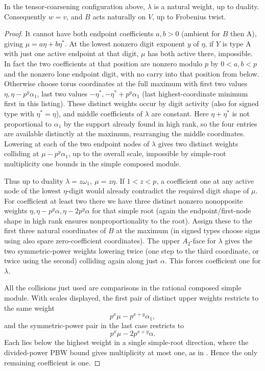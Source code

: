 \begin{lemma}
\label{fb:natural-recognition}
In the tensor-coarsening configuration above, \(\lambda\) is a natural
weight, up to duality.  Consequently \(w=v\), and \(B\) acts naturally
on \(V\), up to Frobenius twist.
\end{lemma}
\begin{proof}

It cannot have both endpoint coefficients \(a,b>0\) (ambient for \(B\) then A), giving \(\mu=a\eta+b\eta^*\). At the lowest nonzero digit exponent \(y\) of \(\eta\), if \(Y\) is type A with just one active endpoint at that digit, \(\mu\) has both active there, impossible. In fact the two coefficients at that position are nonzero modulo \(p\) by \(0<a,b<p\) and the nonzero lone endpoint digit, with no carry into that position from below. Otherwise choose torus coordinates at the full maximum with first two values \(\eta,\eta-p^y\alpha_1\), last two values \(-\eta^*, -\eta^*+p^y\alpha_1\) (last highest-coordinate minimum first in this listing). These distinct weights occur by digit activity (also for signed type with \(\eta^*=\eta\)), and middle coefficients of \(\lambda\) are constant. Here \(\eta+\eta^*\) is not proportional to \(\alpha_1\) by the support already found in high rank, so the four entries are available distinctly at the maximum, rearranging the middle coordinates. Lowering at each of the two endpoint nodes of \(\lambda\) gives two distinct weights colliding at \(\mu-p^y\alpha_1\), up to the overall scale, impossible by simple-root multiplicity one bounds in the simple composed module.

Thus up to duality \(\lambda=z\omega_1,\ \mu=z\eta\). If \(1<z<p\), a coefficient one at any active node of the lowest \(\eta\)-digit would already contradict the required digit shape of \(\mu\). For coefficient at least two there we have three distinct nonzero nonopposite weights \(\eta,\eta-p^y\alpha,\eta-2p^y\alpha\) for that simple root (again the endpoint/first-node shape in high rank ensures nonproportionality to the root). Assign these to the first three natural coordinates of \(B\) at the maximum (in signed types choose signs using also spare zero-coefficient coordinates). The upper \(A_2\)-face for \(\lambda\) gives the two symmetric-power weights lowering twice (one step to the third coordinate, or twice using the second) colliding again along just \(\alpha\). This forces coefficient one for \(\lambda\).

All the collisions just used are comparisons in the rational composed
simple module.  With scales displayed, the first pair of distinct upper
weights restricts to the same weight
\[
             p^x\mu-p^{x+y}\alpha_1,
\]
and the symmetric-power pair in the last case restricts to
\[
             p^x\mu-2p^{x+y}\alpha.
\]
Each lies below the highest weight in a single simple-root direction, where
the divided-power PBW bound gives multiplicity at most one, as in
.  Hence the only remaining coefficient is one.
\end{proof}

